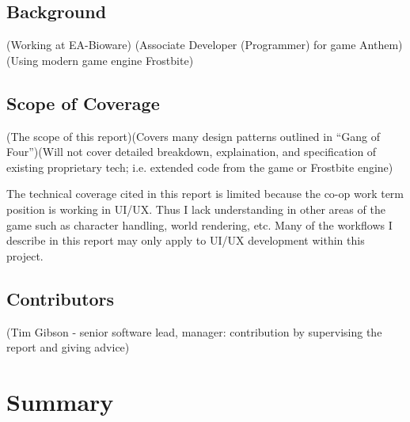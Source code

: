 \documentclass[10pt,letterpaper]{article}
\begin{document}
\subsection*{Background}

(Working at EA-Bioware)
(Associate Developer (Programmer) for game Anthem)
(Using modern game engine Frostbite)

\subsection*{Scope of Coverage}

(The scope of this report)(Covers many design patterns outlined in ``Gang of Four'')(Will not cover detailed breakdown, explaination, and specification of existing proprietary tech; i.e. extended code from the game or Frostbite engine)

The technical coverage cited in this report is limited because the co-op work term position is working in UI/UX. Thus I lack understanding in other areas of the game such as character handling, world rendering, etc. Many of the workflows I describe in this report may only apply to UI/UX development within this project.

\subsection*{Contributors}

(Tim Gibson - senior software lead, manager: contribution by supervising the report and giving advice) 

\newpage

\section*{Summary}
\newpage

\listoffigures
{}
\listoftables
{}
\newpage

\setcounter{page}{1}
\setcounter{section}{0}
\end{document}

